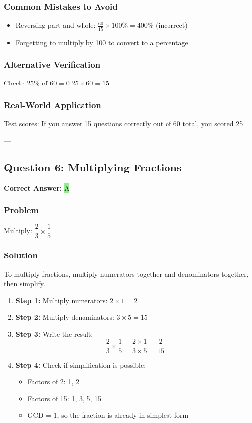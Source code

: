 \documentclass[12pt]{article}
\begin{document}
\subsubsection*{Common Mistakes to Avoid}
\begin{itemize}
\item Reversing part and whole: $\frac{60}{15} \times 100\% = 400\%$ (incorrect)
\item Forgetting to multiply by 100 to convert to a percentage
\end{itemize}

\subsubsection*{Alternative Verification}
Check: $25\% \text{ of } 60 = 0.25 \times 60 = 15$ 

\subsubsection*{Real-World Application}
Test scores: If you answer 15 questions correctly out of 60 total, you scored 25%

---

\subsection{Question 6: Multiplying Fractions}

\textbf{Correct Answer: } \colorbox{lightgreen}{A}

\subsubsection*{Problem}
Multiply: $\dfrac{2}{3} \times \dfrac{1}{5}$

\subsubsection*{Solution}

To multiply fractions, multiply numerators together and denominators together, then simplify.

\begin{enumerate}
\item \textbf{Step 1:} Multiply numerators: $2 \times 1 = 2$
\item \textbf{Step 2:} Multiply denominators: $3 \times 5 = 15$
\item \textbf{Step 3:} Write the result:
  \[
  \frac{2}{3} \times \frac{1}{5} = \frac{2 \times 1}{3 \times 5} = \frac{2}{15}
  \]
\item \textbf{Step 4:} Check if simplification is possible:
  \begin{itemize}
  \item Factors of 2: 1, 2
  \item Factors of 15: 1, 3, 5, 15
  \item GCD = 1, so the fraction is already in simplest form
  \end{itemize}
\end{enumerate}
\end{document}
